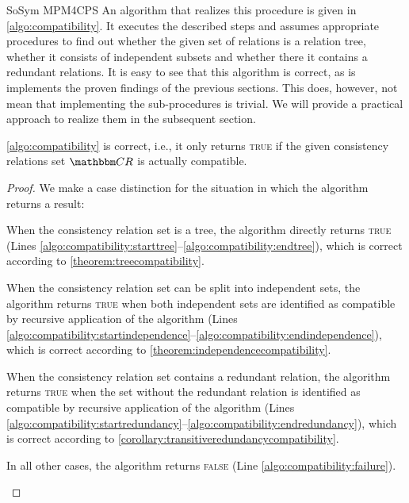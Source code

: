 \begin{copiedFrom}{SoSym MPM4CPS}
An algorithm that realizes this procedure is given in \autoref{algo:compatibility}.
It executes the described steps and assumes appropriate procedures to find out whether the given set of relations is a relation tree, whether it consists of independent subsets and whether there it contains a redundant relations.
It is easy to see that this algorithm is correct, as is implements the proven findings of the previous sections.
This does, however, not mean that implementing the sub-procedures is trivial.
We will provide a practical approach to realize them in the subsequent section.

\begin{theorem}
    \label{theorem:compatibilityalgorithmcorrectness}
    \autoref{algo:compatibility} is correct, i.e., it only returns \textsc{true} if the given consistency relations set $\consistencyrelationset{CR}$ is actually compatible.
\end{theorem}

\begin{proof}
    We make a case distinction for the situation in which the algorithm returns a result:
    \begin{properenumerate}
        \item When the consistency relation set is a tree, the algorithm directly returns \textsc{true} (Lines \ref{algo:compatibility:starttree}--\ref{algo:compatibility:endtree}), which is correct according to \autoref{theorem:treecompatibility}.
        \item When the consistency relation set can be split into independent sets, the algorithm returns \textsc{true} when both independent sets are identified as compatible by recursive application of the algorithm (Lines \ref{algo:compatibility:startindependence}--\ref{algo:compatibility:endindependence}), which is correct according to \autoref{theorem:independencecompatibility}.
        \item When the consistency relation set contains a redundant relation, the algorithm returns \textsc{true} when the set without the redundant relation is identified as compatible by recursive application of the algorithm (Lines \ref{algo:compatibility:startredundancy}--\ref{algo:compatibility:endredundancy}), which is correct according to \autoref{corollary:transitiveredundancycompatibility}.
        \item In all other cases, the algorithm returns \textsc{false} (Line \ref{algo:compatibility:failure}).
        \qedhere
    \end{properenumerate}
\end{proof}


\end{copiedFrom}
